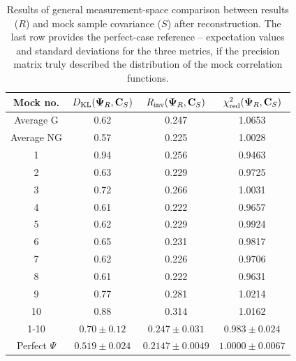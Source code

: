 \begin{table}
\centering
\begin{tabular}{|c|c|c|c|}
\hline
Mock no. & $D_{\rm KL} {\left( {\bf \Psi}_R, {\bf C}_S \right)}$ & $R_{\rm inv} {\left( {\bf \Psi}_R, {\bf C}_S \right)}$ & $\chi^2_{\rm red} {\left( {\bf \Psi}_R, {\bf C}_S \right)}$ \\
\hline
Average G & 0.62 & 0.247 & 1.0653 \\
Average NG & 0.57 & 0.225 & 1.0028 \\
\hline
1 & 0.94 & 0.256 & 0.9463 \\
2 & 0.63 & 0.229 & 0.9725 \\
3 & 0.72 & 0.266 & 1.0031 \\
4 & 0.61 & 0.222 & 0.9657 \\
5 & 0.62 & 0.229 & 0.9924 \\
6 & 0.65 & 0.231 & 0.9817 \\
7 & 0.62 & 0.226 & 0.9706 \\
8 & 0.61 & 0.222 & 0.9631 \\
9 & 0.77 & 0.281 & 1.0214 \\
10 & 0.88 & 0.314 & 1.0162 \\
\hline
1-10 & $0.70 \pm 0.12$ & $0.247 \pm 0.031$ & $0.983 \pm 0.024$ \\
\hline
Perfect $\Psi$ & $0.519 \pm 0.024$ & $0.2147 \pm 0.0049$ & $1.0000 \pm 0.0067$ \\
\hline
\end{tabular}
\caption[General (measurement-space) comparison between \rascalc{} and sample covariance for \desimtwo{} mocks after reconstruction]{Results of general measurement-space comparison between \rascalc{} results ($R$) and mock sample covariance ($S$) after reconstruction.
The last row provides the perfect-case reference -- expectation values and standard deviations for the three metrics, if the \rascalc{} precision matrix truly described the distribution of the mock correlation functions.
}
\label{tab:comparison-measurement-post}
\end{table}

